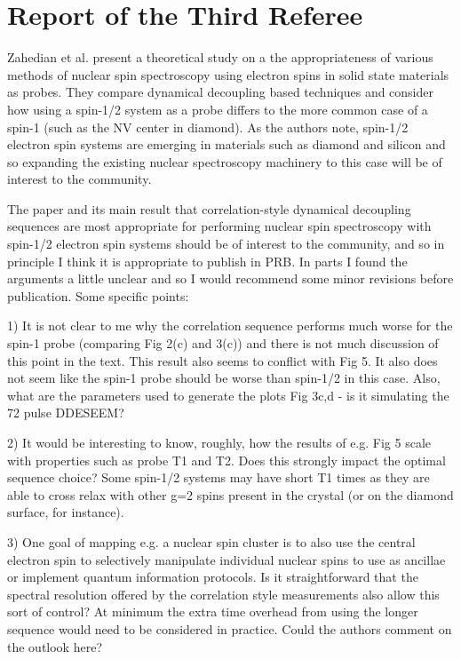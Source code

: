 \documentclass[12pt]{amsart}
\begin{document}
	\color{red} \section{Report of the Third Referee}
	Zahedian et al. present a theoretical study on a the appropriateness of
	various methods of nuclear spin spectroscopy using electron spins in
	solid state materials as probes. They compare dynamical decoupling
	based techniques and consider how using a spin-1/2 system as a probe
	differs to the more common case of a spin-1 (such as the NV center in
	diamond). As the authors note, spin-1/2 electron spin systems are
	emerging in materials such as diamond and silicon and so expanding the
	existing nuclear spectroscopy machinery to this case will be of
	interest to the community.
	
	The paper and its main result that correlation-style dynamical
	decoupling sequences are most appropriate for performing nuclear spin
	spectroscopy with spin-1/2 electron spin systems should be of interest
	to the community, and so in principle I think it is appropriate to
	publish in PRB. In parts I found the arguments a little unclear and so
	I would recommend some minor revisions before publication. Some
	specific points:
	
	1) It is not clear to me why the correlation sequence performs much
	worse for the spin-1 probe (comparing Fig 2(c) and 3(c)) and there is
	not much discussion of this point in the text. This result also seems
	to conflict with Fig 5. It also does not seem like the spin-1 probe
	should be worse than spin-1/2 in this case. Also, what are the
	parameters used to generate the plots Fig 3c,d - is it simulating the
	72 pulse DDESEEM?
	
	2) It would be interesting to know, roughly, how the results of e.g.
	Fig 5 scale with properties such as probe T1 and T2. Does this
	strongly impact the optimal sequence choice? Some spin-1/2 systems may
	have short T1 times as they are able to cross relax with other g=2
	spins present in the crystal (or on the diamond surface, for
	instance).
	
	3) One goal of mapping e.g. a nuclear spin cluster is to also use the
	central electron spin to selectively manipulate individual nuclear
	spins to use as ancillae or implement quantum information protocols.
	Is it straightforward that the spectral resolution offered by the
	correlation style measurements also allow this sort of control? At
	minimum the extra time overhead from using the longer sequence would
	need to be considered in practice. Could the authors comment on the
	outlook here?
	
\end{document}
